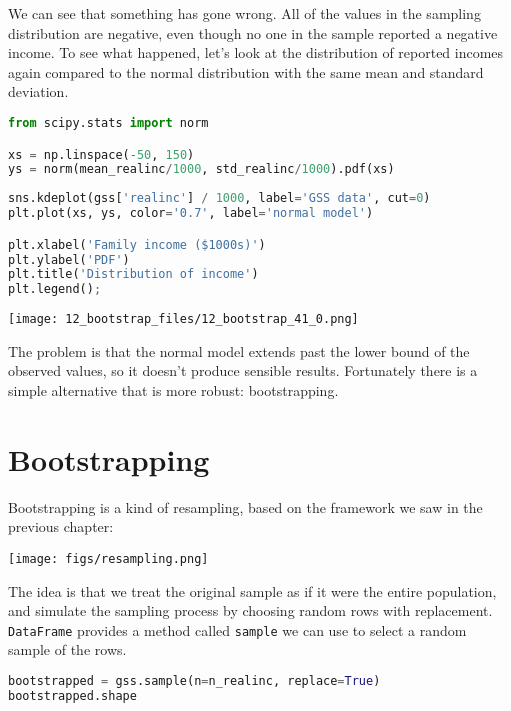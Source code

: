 We can see that something has gone wrong. All of the values in the
sampling distribution are negative, even though no one in the sample
reported a negative income. To see what happened, let's look at the
distribution of reported incomes again compared to the normal
distribution with the same mean and standard deviation.

\begin{lstlisting}[language=Python,style=source]
from scipy.stats import norm

xs = np.linspace(-50, 150)
ys = norm(mean_realinc/1000, std_realinc/1000).pdf(xs)
\end{lstlisting}

\begin{lstlisting}[language=Python,style=source]
sns.kdeplot(gss['realinc'] / 1000, label='GSS data', cut=0)
plt.plot(xs, ys, color='0.7', label='normal model')

plt.xlabel('Family income ($1000s)')
plt.ylabel('PDF')
plt.title('Distribution of income')
plt.legend();
\end{lstlisting}

\begin{center}
\texttt{[image: 12\_bootstrap\_files/12\_bootstrap\_41\_0.png]}
\end{center}

The problem is that the normal model extends past the lower bound of the
observed values, so it doesn't produce sensible results. Fortunately
there is a simple alternative that is more robust: bootstrapping.

\section{Bootstrapping}\label{bootstrapping}

Bootstrapping is a kind of resampling, based on the framework we saw in
the previous chapter:


\texttt{[image: figs/resampling.png]}

The idea is that we treat the original sample as if it were the entire
population, and simulate the sampling process by choosing random rows
with replacement. \passthrough{\lstinline!DataFrame!} provides a method
called \passthrough{\lstinline!sample!} we can use to select a random
sample of the rows.

\begin{lstlisting}[language=Python,style=source]
bootstrapped = gss.sample(n=n_realinc, replace=True)
bootstrapped.shape
\end{lstlisting}

